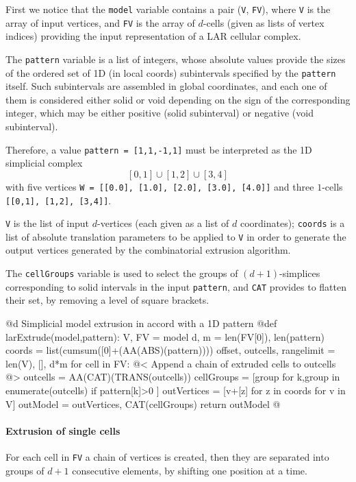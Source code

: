 \documentclass[11pt,oneside]{article}	%
\begin{document}
First we notice that the \texttt{model} variable contains a pair (\texttt{V}, \texttt{FV}), where \texttt{V} is the array of input vertices, and \texttt{FV} is the array of $d$-cells (given as lists of vertex indices) providing the  input representation of a LAR cellular complex.

The \texttt{pattern} variable is a list of integers, whose absolute values provide the sizes of the ordered set of 1D (in local coords) subintervals specified by the \texttt{pattern} itself. Such subintervals are assembled in global coordinates, and each one of them is considered either solid or void depending on the sign of the corresponding integer, which may be either positive (solid subinterval) or negative (void subinterval).  

Therefore, a value \texttt{pattern = [1,1,-1,1]} must be interpreted as the 1D simplicial complex
\[
[0,1] \cup [1,2] \cup [3,4]
\]
with five vertices \texttt{W = [[0.0], [1.0], [2.0], [3.0], [4.0]]} and three $1$-cells \texttt{[[0,1], [1,2], [3,4]]}.

\texttt{V} is the list of input $d$-vertices (each given as a list of $d$ coordinates);
\texttt{coords} is a list of absolute translation parameters to be applied to \texttt{V} in order to generate the output vertices generated by the combinatorial extrusion algorithm.

The \texttt{cellGroups} variable is used to select the groups of $(d+1)$-simplices corresponding to solid intervals in the input \texttt{pattern}, and \texttt{CAT} provides to flatten their set, by removing a level of square brackets.

@d Simplicial model extrusion in accord with a 1D pattern
@{def larExtrude(model,pattern):
    V, FV = model
    d, m = len(FV[0]), len(pattern)
    coords = list(cumsum([0]+(AA(ABS)(pattern))))
    offset, outcells, rangelimit = len(V), [], d*m
    for cell in FV:
        @< Append a chain of extruded cells to outcells @>
    outcells = AA(CAT)(TRANS(outcells))
    cellGroups = [group for k,group in enumerate(outcells) if pattern[k]>0 ]
    outVertices = [v+[z] for z in coords for v in V]
    outModel = outVertices, CAT(cellGroups)
    return outModel
@}

\paragraph{Extrusion of single cells}
For each cell in \texttt{FV} a chain of vertices is created, then they are separated into groups of $d+1$ consecutive elements, by shifting one position at a time.
\end{document}
